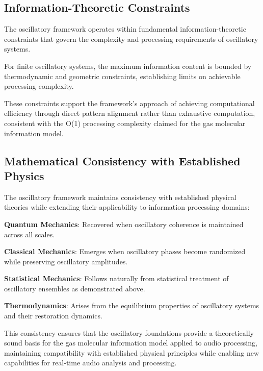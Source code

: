 
\subsection{Information-Theoretic Constraints}

The oscillatory framework operates within fundamental information-theoretic constraints that govern the complexity and processing requirements of oscillatory systems.

\begin{theorem}
For finite oscillatory systems, the maximum information content is bounded by thermodynamic and geometric constraints, establishing limits on achievable processing complexity.
\end{theorem}

These constraints support the framework's approach of achieving computational efficiency through direct pattern alignment rather than exhaustive computation, consistent with the O(1) processing complexity claimed for the gas molecular information model.

\subsection{Mathematical Consistency with Established Physics}

The oscillatory framework maintains consistency with established physical theories while extending their applicability to information processing domains:

\textbf{Quantum Mechanics}: Recovered when oscillatory coherence is maintained across all scales.

\textbf{Classical Mechanics}: Emerges when oscillatory phases become randomized while preserving oscillatory amplitudes.

\textbf{Statistical Mechanics}: Follows naturally from statistical treatment of oscillatory ensembles as demonstrated above.

\textbf{Thermodynamics}: Arises from the equilibrium properties of oscillatory systems and their restoration dynamics.

This consistency ensures that the oscillatory foundations provide a theoretically sound basis for the gas molecular information model applied to audio processing, maintaining compatibility with established physical principles while enabling new capabilities for real-time audio analysis and processing.

